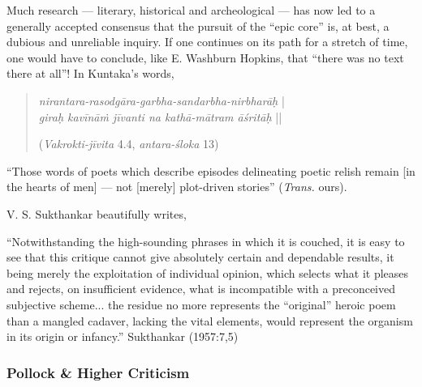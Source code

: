 Much research --- literary, historical and archeological --- has now led to a generally accepted consensus that the pursuit of the “epic core” is, at best, a dubious and unreliable inquiry. If one continues on its path for a stretch of time, one would have to conclude, like E. Washburn Hopkins, that “there was no text there at all”! In Kuntaka's words, 
\begin{quote}
{{\sl nirantara-rasodgāra-garbha-sandarbha-nirbharāḥ}} |\\
{\sl giraḥ kavīnāṁ jīvanti na kathā-mātram āśritāḥ} || 

\hfill({\sl Vakrokti-jīvita} 4.4, {\sl antara-śloka} 13)
\end{quote}

\begin{myquote}
``Those words of poets which describe episodes delineating poetic relish remain [in the hearts of men] --- not [merely] plot-driven stories'' ({\sl Trans.} ours).
\end{myquote}

V. S. Sukthankar beautifully writes, 

\begin{myquote}
“Notwithstanding the high-sounding phrases in which it is couched, it is easy to see that this critique cannot give absolutely certain and dependable results, it being merely the exploitation of individual opinion, which selects what it pleases and rejects, on insufficient evidence, what is incompatible with a preconceived subjective scheme... the residue no more represents the “original” heroic poem than a mangled cadaver, lacking the vital elements, would represent the organism in its origin or infancy.”
\hfill Sukthankar (1957:7,5)\\[-.6cm]
\end{myquote}

\subsubsection{Pollock \& Higher Criticism}\label{sec1.1.1.2}

